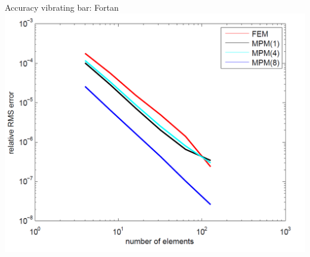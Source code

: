 \documentclass[mathserif,professionalfont,hyperref={pdfpagelabels=false}]{beamer}
\begin{document}
\begin{frame}{Accuracy vibrating bar: Fortan}
\centering
\includegraphics[width=0.7\paperwidth,height=0.7\paperheight]{images/accuracy_vib_bar}
\end{frame}
\end{document}
